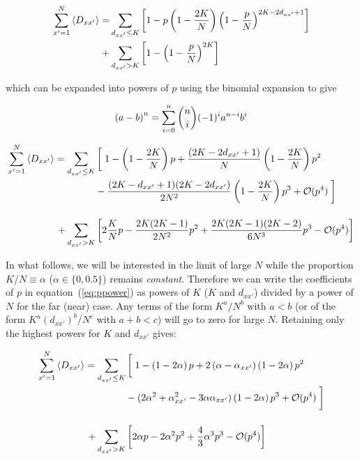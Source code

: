 \begin{align}
    \sum_{x'=1}^N \left< D_{xx'} \right> = &\sum_{d_{xx'}\leq K} \left[
    1 - p\left(1-\frac{2K}{N}\right)\left(1-\frac{p}{N}\right)^{2K - 2d_{xx'} + 1} \right] \notag\\
        + &\sum_{d_{xx'}>K} \left[ 1 - \left( 1 - \frac{p}{N} \right)^{2K} \right]
\end{align}

\noindent which can be expanded into powers of $p$ using the binomial expansion to give

\begin{align}
    \left( a - b \right)^n = \sum_{i=0}^n \binom{n}{i}(-1)^ia^{n-i}b^{i} \notag
\end{align}

\begin{align}
    \label{eq:ppower}
    \begin{split}
    \sum_{x'=1}^N \left< D_{xx'} \right> = \sum_{d_{xx'}\leq K} &\left[ \vphantom{\frac{2K}{N}} \right. 1 - \left( 1 - \frac{2K}{N} \right) p + \frac{\left( 2K-2d_{xx'}+1 \right)}{N} \left( 1 - \frac{2K}{N} \right) p^2 \\
    &- \frac{(2K-d_{xx'}+1)(2K-2d_{xx'})}{2N^2}\left( 1 - \frac{2K}{N} \right)p^3 + \mathcal{O}(p^4) \left. \vphantom{\frac{2K}{N}} \right] \\[12pt]
    +\sum_{d_{xx'}> K} &\left[ 2\frac{K}{N}p - \frac{2K(2K-1)}{2N^2}p^2 + \frac{2K(2K-1)(2K-2)}{6N^3}p^3 - \mathcal{O}(p^4) \right]
    \end{split}
\end{align}

In what follows, we will be interested in the limit of large $N$ while the proportion $K/N\equiv \alpha$ ($\alpha \in \{0, 0.5\}$)
remains \textit{constant}. Therefore we can write the coefficients of $p$ in equation~(\ref{eq:ppower}) as powers of $K$ ($K$ and
$d_{xx'}$) divided by a power of $N$ for the far (near) case. Any terms of the form $K^a/N^b$ with $a<b$ (or of the form
$K^a(d_{xx'})^b/N^c$ with $a+b<c$) will go to zero for large $N$. Retaining only the highest powers for $K$ and $d_{xx'}$ gives:

\begin{align}
    \label{eq:ppower2}
    \begin{split}
    \sum_{x'=1}^N \left< D_{xx'} \right> = \sum_{d_{xx'}\leq K} &\left[ \vphantom{\frac{2K}{N}} \right. 1 - \left( 1 - 2\alpha \right) p + 2\left( \alpha-\alpha_{xx'} \right) \left( 1 - 2\alpha \right) p^2 \\
    &- (2\alpha^2 + \alpha_{xx'}^2 - 3\alpha\alpha_{xx'})\left( 1 - 2\alpha \right)p^3 + \mathcal{O}(p^4) \left. \vphantom{\frac{2K}{N}} \right] \\[12pt]
    +\sum_{d_{xx'}> K} &\left[ 2\alpha p - 2\alpha^2 p^2 + \frac{4}{3}\alpha^3 p^3 - \mathcal{O}(p^4) \right]
    \end{split}
\end{align}

